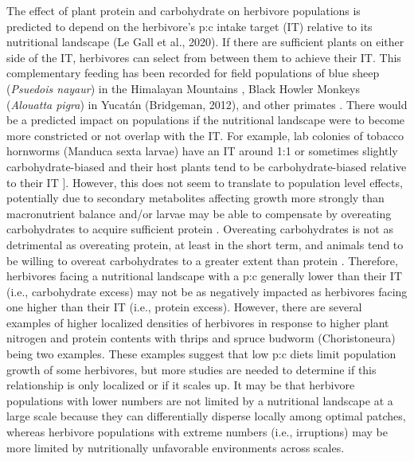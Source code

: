 \documentclass[
]{article}
\begin{document}
The effect of plant protein and carbohydrate on herbivore populations is
predicted to depend on the herbivore's p:c intake target (IT) relative
to its nutritional landscape (Le Gall et al., 2020). If there are
sufficient plants on either side of the IT, herbivores can select from
between them to achieve their IT. This complementary feeding has been
recorded for field populations of blue sheep (\emph{Psuedois nayaur}) in
the Himalayan Mountains \citep{aryal_foods_2015}, Black Howler Monkeys
(\emph{Alouatta pigra}) in Yucatán (Bridgeman, 2012), and other primates
\citep{raubenheimer_nutritional_2013}. There would be a predicted impact
on populations if the nutritional landscape were to become more
constricted or not overlap with the IT. For example, lab colonies of
tobacco hornworms (Manduca sexta larvae) have an IT around 1:1 or
sometimes slightly carbohydrate-biased \citep{wilson_dietary_2019} and
their host plants tend to be carbohydrate-biased relative to their IT
\citet{wilson_nutritional_2019}{]}. However, this does not seem to
translate to population level effects, potentially due to secondary
metabolites affecting growth more strongly than macronutrient balance
and/or larvae may be able to compensate by overeating carbohydrates to
acquire sufficient protein \citep{wilson_dietary_2019}. Overeating
carbohydrates is not as detrimental as overeating protein, at least in
the short term, and animals tend to be willing to overeat carbohydrates
to a greater extent than protein
\citep{cheng_geometry_2008, simpson_nature_2012}. Therefore, herbivores
facing a nutritional landscape with a p:c generally lower than their IT
(i.e., carbohydrate excess) may not be as negatively impacted as
herbivores facing one higher than their IT (i.e., protein excess).
However, there are several examples of higher localized densities of
herbivores in response to higher plant nitrogen and protein contents
with thrips \citep{brown_relationship_2002} and spruce budworm
(Choristoneura) \citep{de_grandpre_defoliation-induced_2022} being two
examples. These examples suggest that low p:c diets limit population
growth of some herbivores, but more studies are needed to determine if
this relationship is only localized or if it scales up. It may be that
herbivore populations with lower numbers are not limited by a
nutritional landscape at a large scale because they can differentially
disperse locally among optimal patches, whereas herbivore populations
with extreme numbers (i.e., irruptions) may be more limited by
nutritionally unfavorable environments across scales.
\end{document}
